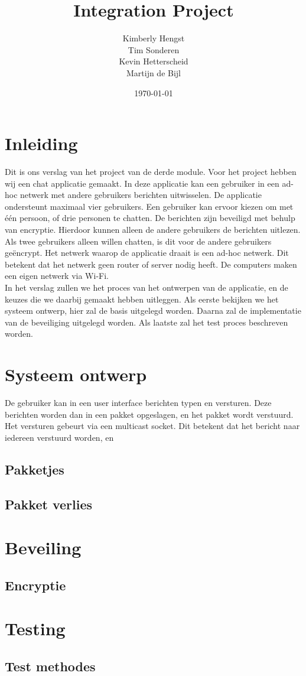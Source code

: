 \documentclass{article}
\title{Integration Project}
\author{Kimberly Hengst \\ Tim Sonderen \\ Kevin Hetterscheid \\ Martijn de Bijl}
\date{\today}
\begin{document}
\maketitle

\newpage

\tableofcontents

\section{Inleiding}
Dit is ons verslag van het project van de derde module. Voor het project hebben wij een chat applicatie gemaakt. In deze applicatie kan een gebruiker in een ad-hoc netwerk met andere gebruikers berichten uitwisselen. De applicatie ondersteunt maximaal vier gebruikers. Een gebruiker kan ervoor kiezen om met één persoon, of drie personen te chatten. De berichten zijn beveiligd met behulp van encryptie. Hierdoor kunnen alleen de andere gebruikers de berichten uitlezen. Als twee gebruikers alleen willen chatten, is dit voor de andere gebruikers geëncrypt. Het netwerk waarop de applicatie draait is een ad-hoc netwerk. Dit betekent dat het netwerk geen router of server nodig heeft. De computers  maken een eigen netwerk via Wi-Fi.
\\
In het verslag zullen we het proces van het ontwerpen van de applicatie, en de keuzes die we daarbij gemaakt hebben uitleggen. Als eerste bekijken we het systeem ontwerp, hier zal de basis uitgelegd worden. Daarna zal de implementatie van de beveiliging uitgelegd worden. Als laatste zal het test proces beschreven worden.

\newpage

\section{Systeem ontwerp}
De gebruiker kan in een user interface berichten typen en versturen. Deze berichten worden dan in een pakket opgeslagen, en het pakket wordt verstuurd. Het versturen gebeurt via een multicast socket. Dit betekent dat het bericht naar iedereen verstuurd worden, en 
\subsection{Pakketjes}

\subsection{Pakket verlies}

\section{Beveiling}
\subsection{Encryptie}


\section{Testing}
\subsection{Test methodes}
\end{document}
